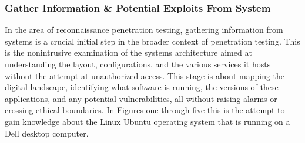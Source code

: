 \documentclass[manuscript,acmsmall,anonymous,review,screen,nonacm=true, authorversion=true]{acmart}
\begin{document}
\subsubsection{ Gather Information \& Potential Exploits From System}
In the area of reconnaissance penetration testing, gathering information from systems is a
crucial initial step in the broader context of penetration testing. This is the nonintrusive examination of the systems architecture aimed at understanding the layout,
configurations, and the various services it hosts without the attempt at unauthorized access. This stage is about mapping the digital landscape, identifying what software is
running, the versions of these applications, and any potential vulnerabilities, all without raising
alarms or crossing ethical boundaries. In Figures one through five this is the
attempt to gain knowledge about the Linux Ubuntu operating system that is running on a Dell
desktop computer. 
\end{document}
